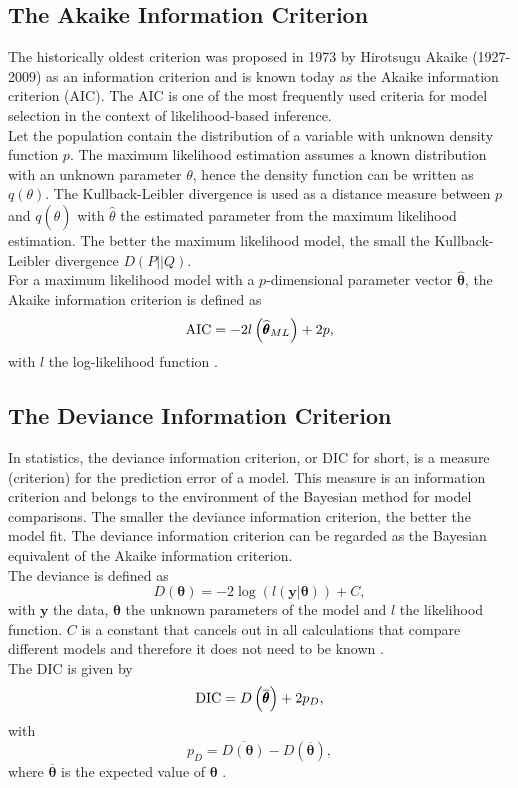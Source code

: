 \subsection{The Akaike Information Criterion}
The historically oldest criterion was proposed in 1973 by Hirotsugu Akaike (1927-2009) as an information criterion and is known today as the Akaike information criterion (AIC). The AIC is one of the most frequently used criteria for model selection in the context of likelihood-based inference.  \\
Let the population contain the distribution of a variable with unknown density function $p$. The maximum likelihood estimation assumes a known distribution with an unknown parameter $\theta$, hence the density function can be written as $q\left(\theta\right)$. The Kullback-Leibler divergence is used as a distance measure between $p$ and $q\left(\widehat{\theta}\right)$ with $\widehat{\theta}$ the estimated parameter from the maximum likelihood estimation. The better the maximum likelihood model, the small the Kullback-Leibler divergence $D\left(P||Q\right)$. \\
For a maximum likelihood model with a $p$-dimensional parameter vector $\widehat{\pmb{\theta}}$, the Akaike information criterion is defined as
\begin{equation}
    \hbox{AIC}=-2l\left(\widehat{\pmb{\theta}}_{ML}\right)+2p,
\end{equation}
with $l$ the log-likelihood function \autocite[][]{akaike1974new}.
\subsection{The Deviance Information Criterion}
In statistics, the deviance information criterion, or DIC for short, is a measure (criterion) for the prediction error of a model.
This measure is an information criterion and belongs to the environment of the Bayesian method for model comparisons. The smaller the deviance information criterion, the better the model fit. The deviance information criterion can be regarded as the Bayesian equivalent of the Akaike information criterion. \\
The deviance is defined as 
\begin{equation}
    D\left(\pmb{\theta}\right)=-2\log\left(l\left(\pmb{y}|\pmb{\theta}\right)\right)+C,
\end{equation}
with $\pmb{y}$ the data, $\pmb{\theta}$ the unknown parameters of the model and $l$ the likelihood function. $C$ is a constant that cancels out in all calculations that compare different models and therefore it does not need to be known \autocite[][]{nelder1972generalized}. \\
The DIC is given by
\begin{equation}
    \hbox{DIC}=D\left(\overline{\pmb{\theta}}\right)+2p_D,
\end{equation}
with
\begin{equation}
    p_D=\overline{D\left(\pmb{\theta}\right)}-D\left(\overline{\pmb{\theta}}\right),
\end{equation}
where $\overline{\pmb{\theta}}$ is the expected value of $\pmb{\theta}$ \autocite[][]{spiegelhalter2014deviance}.
